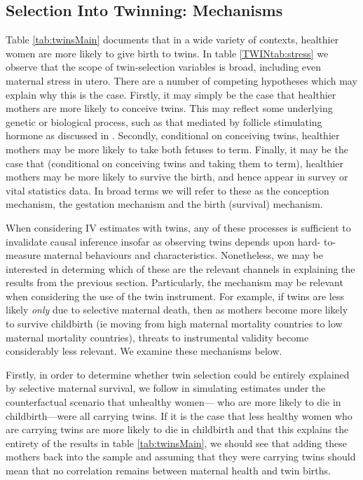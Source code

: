 \documentclass[subeqn]{article}
\begin{document}
\begin{spacing}{1.4}

\subsection{Selection Into Twinning: Mechanisms}   \label{TWINsscn:selection}
Table \ref{tab:twinsMain} documents that in a wide variety of contexts,
healthier women are more likely to give birth to twins.  In table
\ref{TWINtab:stress} we observe that the scope of twin-selection variables is
broad, including even maternal stress in utero.  There are a number of competing
hypotheses which may explain why this is the case.  Firstly, it may simply be
the case that healthier mothers are more likely to conceive twins.  This may
reflect some underlying genetic or biological process, 
such as that mediated by follicle stimulating hormone as discussed in 
\citet{Hall2003}.  Secondly, conditional on conceiving twins, healthier mothers 
may be more likely to take both fetuses to term.  Finally, it may be the case 
that (conditional on conceiving twins and taking them to term), healthier mothers 
may be more likely to survive the birth, and hence appear in survey or vital 
statistics data.  In broad terms we will refer to these as the conception 
mechanism, the gestation mechanism and the birth (survival) mechanism.

When considering IV estimates with twins, any of these processes is sufficient 
to invalidate causal inference insofar as observing twins depends upon hard-%
to-measure maternal behaviours and characteristics.  Nonetheless, we may be 
interested in determing which of these are the relevant channels in explaining 
the results from the previous section.  Particularly, the mechanism may be 
relevant when considering the use of the twin instrument.  For example, if twins
are less likely \emph{only} due to selective maternal death, then as mothers
become more likely to survive childbirth (ie moving from high maternal mortality 
countries to low maternal mortality countries), threats to instrumental validity 
become considerably less relevant.  We examine these mechanisms below.

Firstly, in order to determine whether twin selection could be entirely
explained by selective maternal survival, we follow \citet{Aldermanetal2011} in
simulating estimates under the counterfactual scenario that unhealthy women---%
who are more likely to die in childbirth---were all carrying twins.  If it is
the case that less healthy women who are carrying twins are more likely to die
in childbirth and that this explains the entirety of the results in table
\ref{tab:twinsMain}, we should see that adding these mothers back into the
sample and assuming that they were carrying twins should mean that no
correlation remains between maternal health and twin births.


\end{spacing}
\end{document}
